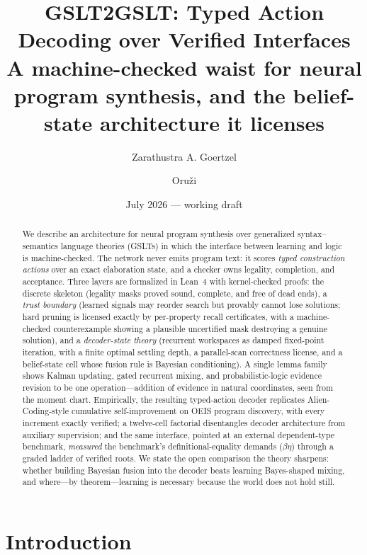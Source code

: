 \documentclass[11pt]{article}
\title{GSLT2GSLT: Typed Action Decoding over Verified Interfaces\\
\large A machine-checked waist for neural program synthesis, and the belief-state
architecture it licenses}
\author{Zarathustra A. Goertzel \and Oru\v{z}i}
\date{July 2026 --- working draft}
\begin{document}
\maketitle

\begin{abstract}
We describe an architecture for neural program synthesis over generalized
syntax--semantics language theories (GSLTs) in which the interface between learning and
logic is machine-checked. The network never emits program text: it scores \emph{typed
construction actions} over an exact elaboration state, and a checker owns legality,
completion, and acceptance. Three layers are formalized in Lean~4 with kernel-checked
proofs: the discrete skeleton (legality masks proved sound, complete, and free of dead
ends), a \emph{trust boundary} (learned signals may reorder search but provably cannot
lose solutions; hard pruning is licensed exactly by per-property recall certificates,
with a machine-checked counterexample showing a plausible uncertified mask destroying a
genuine solution), and a \emph{decoder-state theory} (recurrent workspaces as damped
fixed-point iteration, with a finite optimal settling depth, a parallel-scan correctness
license, and a belief-state cell whose fusion rule is Bayesian conditioning). A single
lemma family shows Kalman updating, gated recurrent mixing, and probabilistic-logic
evidence revision to be one operation---addition of evidence in natural coordinates,
seen from the moment chart. Empirically, the resulting typed-action decoder replicates
Alien-Coding-style cumulative self-improvement on OEIS program discovery, with every
increment exactly verified; a twelve-cell factorial disentangles decoder architecture
from auxiliary supervision; and the same interface, pointed at an external dependent-type
benchmark, \emph{measured} the benchmark's definitional-equality demands
($\beta\eta$) through a graded ladder of verified roots. We state the open comparison
the theory sharpens: whether building Bayesian fusion into the decoder beats learning
Bayes-shaped mixing, and where---by theorem---learning is necessary because the world
does not hold still.
\end{abstract}

\section{Introduction}
\label{sec:intro}
\end{document}
